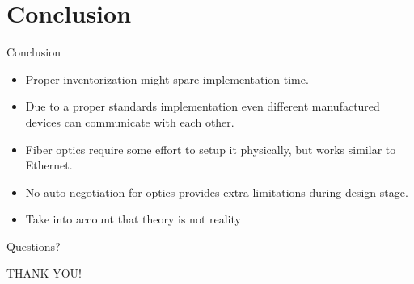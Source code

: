 \documentclass{beamer}
\begin{document}



\section{Conclusion}
\begin{frame}{Conclusion}
\begin{block}{}
\begin{itemize}
\item	Proper inventorization might spare implementation time.
\item	Due to a proper standards implementation even different manufactured devices can communicate with each other.
\item   Fiber optics require some effort to setup it physically, but works similar to Ethernet. 
\item No auto-negotiation for optics provides extra limitations during design stage.
\item   Take into account that theory is not reality

\end{itemize}
\end{block}


\end{frame}

\begin{frame}[allowframebreaks]{Questions?}

THANK YOU!

\def\newblock{}


\end{frame}
\end{document}
